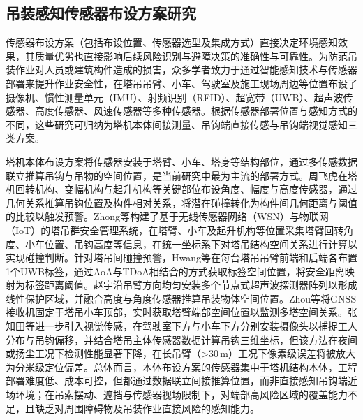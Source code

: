 \subsection{吊装感知传感器布设方案研究}\label{ux540aux88c5ux611fux77e5ux786cux4ef6ux5e03ux7f6eux65b9ux6848ux7814ux7a76}

传感器布设方案（包括布设位置、传感器选型及集成方式）直接决定环境感知效果，其质量优劣也直接影响后续风险识别与避障决策的准确性与可靠性。为防范吊装作业对人员或建筑构件造成的损害，众多学者致力于通过智能感知技术与传感器部署来提升作业安全性，在塔吊吊臂、小车、驾驶室及施工现场周边等位置布设了摄像机\cite{FIQUTEC5}、惯性测量单元（IMU）\cite{NN865XZQ,FWEHHUWL}、射频识别（RFID）\cite{E97V5FCY}、超宽带（UWB）\cite{9LK3VTEQ}、超声波传感器\cite{TWWSPDKK}、高度传感器\cite{U3E4PYX6}、风速传感器\cite{2URRPIZ4}等多种传感器。根据传感器部署位置与感知方式的不同，这些研究可归纳为塔机本体间接测量、吊钩端直接传感与吊钩端视觉感知三类方案。

塔机本体布设方案将传感器安装于塔臂、小车、塔身等结构部位\cite{5}，通过多传感数据联立推算吊钩与吊物的空间位置，是当前研究中最为主流的部署方式。周飞虎\cite{USJ52UW5}在塔机回转机构、变幅机构与起升机构等关键部位布设角度、幅度与高度传感器，通过几何关系推算吊钩位置及构件相对关系，将潜在碰撞转化为构件间几何距离与阈值的比较以触发预警。Zhong等\cite{VNWJWSIA}构建了基于无线传感器网络（WSN）与物联网（IoT）的塔吊群安全管理系统，在塔臂、小车及起升机构等位置采集塔臂回转角度、小车位置、吊钩高度等信息，在统一坐标系下对塔吊结构空间关系进行计算以实现碰撞判断。针对塔吊间碰撞预警，Hwang等\cite{9LK3VTEQ}在每台塔吊吊臂前端和后端各布置1个UWB标签，通过AoA与TDoA相结合的方式获取标签空间位置，将安全距离映射为标签距离阈值。赵宇\cite{R5GR6N2A}沿吊臂方向均匀安装多个节点式超声波探测器阵列以形成线性保护区域，并融合高度与角度传感器推算吊装物体空间位置。Zhou等\cite{I2FL5SGE}将GNSS接收机固定于塔吊小车顶部，实时获取塔臂端部空间位置以监测多塔空间关系。张知田等\cite{XBDUPUTH}进一步引入视觉传感，在驾驶室下方与小车下方分别安装摄像头以捕捉工人分布与吊钩偏移，并结合塔吊主体传感器数据计算吊钩三维坐标，但该方法在夜间或扬尘工况下检测性能显著下降，在长吊臂（>30\,m）工况下像素级误差将被放大为分米级定位偏差\cite{XBDUPUTH}。总体而言，本体布设方案的传感器集中于塔机结构本体，工程部署难度低、成本可控，但都通过数据联立间接推算位置，而非直接感知吊钩端近场环境；在吊索摆动、遮挡与传感器视场限制下，对端部高风险区域的覆盖能力不足，且缺乏对周围障碍物及吊装作业直接风险的感知能力。

